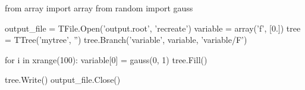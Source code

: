 \begin{footnotesize}
\begin{pyglist}[language=python,texcl=true,abovecaptionskip=0,style=vs,bgcolor=Moccasin]
from array import array
from random import gauss

output_file = TFile.Open('output.root', 'recreate')
variable = array('f', [0.])
tree = TTree('mytree', '')
tree.Branch('variable', variable, 'variable/F')

for i in xrange(100):
    variable[0] = gauss(0, 1)
    tree.Fill()

tree.Write()
output_file.Close()
\end{pyglist}
\end{footnotesize}
